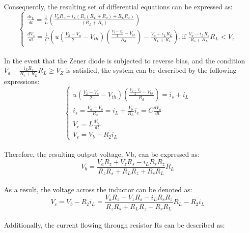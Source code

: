 Consequently, the resulting set of differential equations can be expressed as:\\

\begin{equation}
    \begin{cases}
        \frac{di_L}{dt}=\frac{1}{L}(\frac{V_aR_L-i_L(R_s(R_L+R_2)+R_LR_2)}{(R_L+R_s)})\\
        \frac{dV_a}{dt}=\frac{1}{C}(u(\frac{V_2-V_a}{2}-V_{th})(\frac{\frac{V_2-V_a}{2}-V_{th}}{R_d})-\frac{V_a+i_LR_L}{R_L+R_s}),  \text{if } \frac{V_a-i_LR_s}{R_s+R_L}R_L<V_z
    \end{cases}
\end{equation}\\

In the event that the Zener diode is subjected to reverse bias, and the condition $V_a - \frac{i_L R_s}{R_s+R_L} R_L \geq V_Z$ is satisfied, the system can be described by the following expressions:\\

\begin{equation}
    \begin{cases}
        u(\frac{V_2-V_a}{2}-V_{th})(\frac{\frac{V_2-V_a}{2}-V_{th}}{R_d})=i_s+i_L\\
        i_s=\frac{V_a-V_b}{R_s}=i_L+\frac{V_b}{R_L}
        i_c=C\frac{dV_a}{dt}\\
        V_c=L\frac{di_L}{dt}\\
        V_c=V_b-R_2i_L
    \end{cases}
\end{equation}\\

Therefore, the resulting output voltage, Vb, can be expressed as:\\

\begin{equation}
    V_b=\frac{V_aR_z+V_zR_s-i_LR_sR_z}{R_zR_s+R_LR_z+R_sR_L}R_L
\end{equation}\\

As a result, the voltage across the inductor can be denoted as:\\

\begin{equation}
    V_c=V_b-R_2i_L=\frac{V_aR_z+V_zR_s-i_LR_sR_z}{R_zR_s+R_LR_z+R_sR_L}R_L-R_2i_L
\end{equation}\\

Additionally, the current flowing through resistor Rs can be described as:\\

